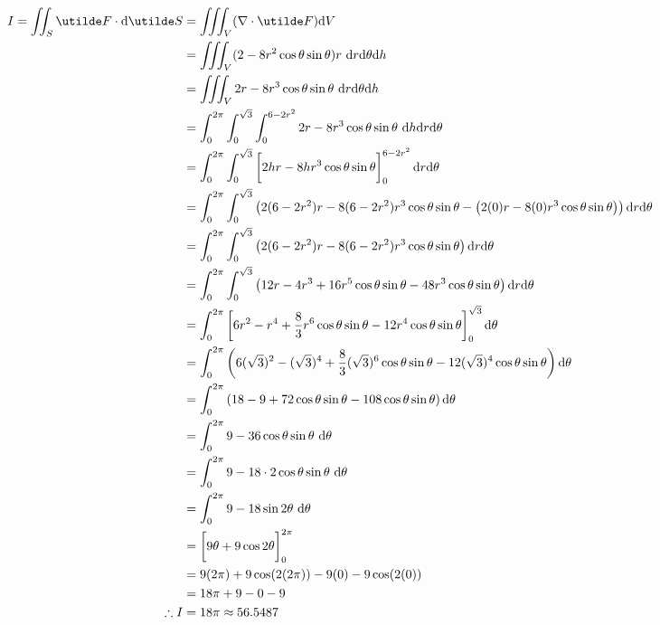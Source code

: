\documentclass[a4paper,12pt]{report}
\begin{document}
\begin{align*}
  I = \iint_S \ut{F}\cd\d\ut{S} &= \iiint_V (\grad\cd\ut{F})\d V \\
    &= \iiint_V (2 - 8r^2\cos\theta\sin\theta)r\ \d r\d\theta\d h \\
    &= \iiint_V 2r - 8r^3\cos\theta\sin\theta\ \d r\d\theta\d h \\
    &= \int_{0}^{2\pi}\int_{0}^{\sqrt{3}}\int_{0}^{6-2r^2} 2r - 8r^3\cos\theta\sin\theta\ \d h\d r\d\theta \\
    &= \int_{0}^{2\pi}\int_{0}^{\sqrt{3}}\sqbracks{\vphantom{\frac{1}{2}}2hr - 8hr^3\cos\theta\sin\theta}_{0}^{6-2r^2}\d r\d\theta \\
    &= \int_{0}^{2\pi}\int_{0}^{\sqrt{3}}\bracks{2(6-2r^2)r - 8(6-2r^2)r^3\cos\theta\sin\theta - \bracks{2(0)r - 8(0)r^3\cos\theta\sin\theta}}\d r\d\theta \\
    &= \int_{0}^{2\pi}\int_{0}^{\sqrt{3}}\bracks{2(6-2r^2)r - 8(6-2r^2)r^3\cos\theta\sin\theta}\d r\d\theta \\
    &= \int_{0}^{2\pi}\int_{0}^{\sqrt{3}}\bracks{12r-4r^3 + 16r^5\cos\theta\sin\theta - 48r^3\cos\theta\sin\theta}\d r\d\theta \\
    &= \int_{0}^{2\pi}\sqbracks{6r^2 - r^4 + \frac{8}{3}r^6\cos\theta\sin\theta - 12r^4\cos\theta\sin\theta}_{0}^{\sqrt{3}}\d\theta \\
    &= \int_{0}^{2\pi}\bracks{6(\sqrt{3})^2 - (\sqrt{3})^4 + \frac{8}{3}(\sqrt{3})^6\cos\theta\sin\theta - 12(\sqrt{3})^4\cos\theta\sin\theta}\d\theta \\
    &= \int_{0}^{2\pi}\bracks{18 - 9 + 72\cos\theta\sin\theta - 108\cos\theta\sin\theta}\d\theta \\
    &= \int_{0}^{2\pi} 9 - 36\cos\theta\sin\theta\ \d\theta \\
    &= \int_{0}^{2\pi} 9 - 18\cd 2\cos\theta\sin\theta\ \d\theta \\
    &= \int_{0}^{2\pi} 9 - 18\sin2\theta\ \d\theta \\
    &= \sqbracks{\vphantom{\frac{1}{2}}9\theta + 9\cos2\theta}_{0}^{2\pi} \\
    &= 9(2\pi) + 9\cos(2(2\pi)) - 9(0) - 9\cos(2(0)) \\
    &= 18\pi + 9 - 0 - 9 \\
  \tf I &= 18\pi \approx 56.5487\\
\end{align*}
\end{document}
